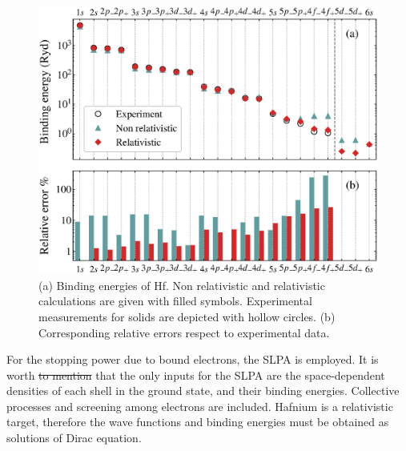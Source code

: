 \documentclass[aps,prb,reprint,groupedaddress]{revtex4-1}
\providecommand{\DIFadd}[1]{{\protect\color{blue}\uwave{#1}}} %
\providecommand{\DIFdel}[1]{{\protect\color{red}\sout{#1}}}                      %
\providecommand{\DIFaddbegin}{} %
\providecommand{\DIFaddend}{} %
\providecommand{\DIFdelbegin}{} %
\providecommand{\DIFdelend}{} %
\newcommand{\DIFscaledelfig}{0.5}
\newlength{\DIFdelgraphicswidth} %
\newlength{\DIFdelgraphicsheight} %
\newcommand{\DIFaddincludegraphics}[2][]{{\color{blue}\fbox{\DIFOincludegraphics[#1]{#2}}}} %
\newcommand{\DIFdelincludegraphics}[2][]{%
\sbox{\DIFdelgraphicsbox}{\DIFOincludegraphics[#1]{#2}}%
\settoboxwidth{\DIFdelgraphicswidth}{\DIFdelgraphicsbox} %
\settoboxtotalheight{\DIFdelgraphicsheight}{\DIFdelgraphicsbox} %
\scalebox{\DIFscaledelfig}{%
\parbox[b]{\DIFdelgraphicswidth}{\usebox{\DIFdelgraphicsbox}\\[-\baselineskip] \rule{\DIFdelgraphicswidth}{0em}}\llap{\resizebox{\DIFdelgraphicswidth}{\DIFdelgraphicsheight}{%
\setlength{\unitlength}{\DIFdelgraphicswidth}%
\begin{picture}(1,1)%
\thicklines\linethickness{2pt} %
{\color[rgb]{1,0,0}\put(0,0){\framebox(1,1){}}}%
{\color[rgb]{1,0,0}\put(0,0){\line( 1,1){1}}}%
{\color[rgb]{1,0,0}\put(0,1){\line(1,-1){1}}}%
\end{picture}%
}\hspace*{3pt}}} %
} %
\DeclareRobustCommand{\DIFaddbegin}{\DIFOaddbegin \let\includegraphics\DIFaddincludegraphics} %
\DeclareRobustCommand{\DIFaddend}{\DIFOaddend \let\includegraphics\DIFOincludegraphics} %
\DeclareRobustCommand{\DIFdelbegin}{\DIFOdelbegin \let\includegraphics\DIFdelincludegraphics} %
\DeclareRobustCommand{\DIFdelend}{\DIFOaddend \let\includegraphics\DIFOincludegraphics} %
\begin{document}
\begin{figure}[!t]
\centering
\includegraphics[width=11.cm]{Hf_bindener_bar.eps}
\caption{(a) Binding energies of Hf. Non relativistic and relativistic calculations are given with filled symbols.  Experimental measurements for solids\cite{williams1995} are depicted with hollow circles. (b) Corresponding relative errors respect to experimental data.}
\label{Binding_E}
\end{figure}

For the stopping power due to bound electrons, the SLPA \cite{mon17,mon13} is employed. It is worth \DIFdelbegin \DIFdel{to mention }\DIFdelend \DIFaddbegin \DIFadd{mentioning }\DIFaddend that the only inputs for the SLPA are the space-dependent densities of each shell in the ground state, and their binding energies. Collective processes and screening among electrons are included. Hafnium is a relativistic target, therefore the wave functions and binding energies must be obtained as solutions of \DIFaddbegin \DIFadd{the }\DIFaddend Dirac equation\cite{mendez2019}.
\end{document}
